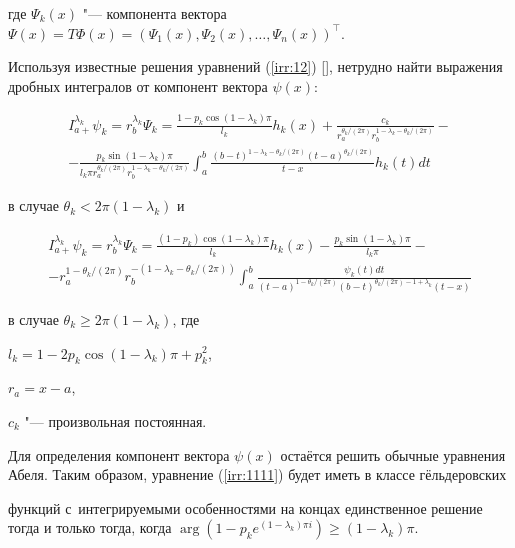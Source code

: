 где $\Psi_{k}(x)$ "--- компонента вектора $\Psi(x)=T\Phi(x)=(\Psi_{1}(x), \Psi_{2}(x), \ldots, \Psi_{n}(x))^{\top}$.



Используя известные решения уравнений (\ref{irr:12}) [], нетрудно найти выражения дробных интегралов от компонент вектора $\psi(x)$:

\begin{multline*}

I_{a+}^{\lambda_{k}}\psi_{k}=r_b^{\lambda_{k}}\Psi_{k}=\frac{1-p_{k}\cos(1-\lambda_{k})\pi}{l_{k}}h_{k}(x)+\frac{c_{k}}{r_a^{{\theta_k/(2\pi)}}r_b^{1-\lambda_{k}-{\theta_k/(2\pi)}}}-\\

-\frac{p_{k}\sin(1-\lambda_{k})\pi}{l_{k}\pi r_a^{{\theta_k/(2\pi)}}r_b^{1-\lambda_{k}-{\theta_k/(2\pi)}}}\int _{a}^{b}\frac{(b-t)^{1-\lambda_{k}-{\theta_k/(2\pi)}}(t-a)^{{\theta_k/(2\pi)}}}{t-x}h_{k}(t)dt

\end{multline*}

в случае $\theta_k<2\pi(1-\lambda_{k})$ и

\begin{multline*}

I_{a+}^{\lambda_{k}}\psi_{k}=r_b^{\lambda_{k}}\Psi_{k}=\frac{(1-p_{k})\cos(1-\lambda_{k})\pi}{l_{k}}h_{k}(x)-\frac{p_{k}\sin(1-\lambda_{k})\pi}{l_{k}\pi}-\\

-r_a^{1-{\theta_k/(2\pi)}}r_b^{-(1-\lambda_{k}-{\theta_k/(2\pi)})}\int _{a}^{b}\frac{\psi_{k}(t)dt}{(t-a)^{1-{\theta_k/(2\pi)}}(b-t)^{{\theta_k/(2\pi)}-1+\lambda_{k}}(t-x)}

\end{multline*}

в случае $\theta_{k}\geq2\pi(1-\lambda_{k})$, где

$l_{k}=1-2p_{k}\cos(1-\lambda_{k})\pi+p_{k}^{2}$,

$r_a= x-a$,

$c_{k}$ "--- произвольная постоянная.





Для определения компонент вектора $\psi(x)$ остаётся решить обычные уравнения Абеля. Таким образом, уравнение (\ref{irr:1111}) будет иметь в классе гёльдеровских

функций с~интегрируемыми особенностями на концах единственное решение тогда и только тогда, когда $\arg(1-p_{k}e^{(1-\lambda_{k})\pi i})\geq(1-\lambda_{k})\pi.$

